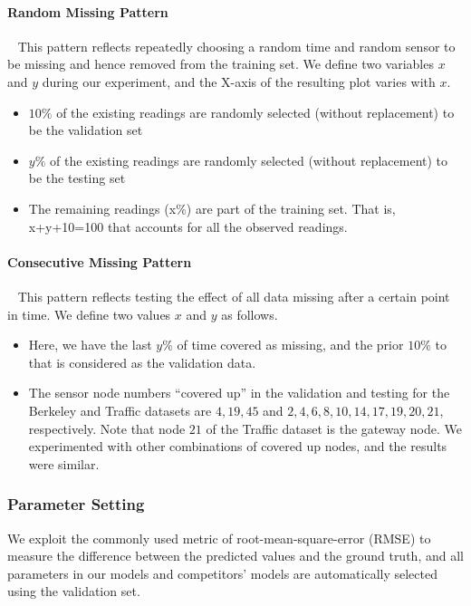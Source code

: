 \paragraph*{Random Missing Pattern} ~
This pattern reflects repeatedly choosing a random time and random sensor to be missing and hence removed from the training set.
%
We define two variables $x$ and $y$ during our experiment, and the X-axis of the resulting plot varies with $x$.
\begin{itemize}
\item $10\%$ of the existing readings are randomly selected (without replacement) to be the validation set
\item $y\%$ of the existing readings are randomly selected (without replacement) to be the testing set
\item The remaining readings (x\%) are part of the training set. That is, x+y+10=100 that accounts for all the observed readings.
\end{itemize}

\paragraph*{Consecutive Missing Pattern} ~
This pattern reflects testing the effect of all data missing after a certain point in time.
We define two values $x$ and $y$ as follows.
\begin{itemize}
\item Here, we have the last $y\%$ of time covered as missing, and the prior $10\%$ to that is considered as the validation data.
\item The sensor node numbers ``covered up'' in the validation and testing for the Berkeley and Traffic datasets are ${4,19,45}$ and ${2,4,6,8,10,14,17,19,20,21}$, respectively.
Note that node $21$ of the Traffic dataset is the gateway node.
We experimented with other combinations of covered up nodes, and the results were similar.
\end{itemize}

\subsubsection{Parameter Setting}

We exploit the commonly used metric of root-mean-square-error (RMSE)
to measure the difference between the predicted values and the ground
truth, and all parameters in our models and competitors' models are
automatically selected using the validation set.

